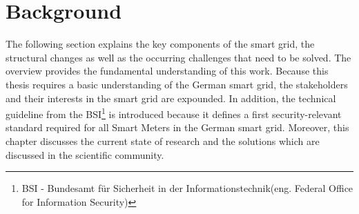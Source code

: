 \chapter{Background}
\label{sec:state}







The following section explains the key components of the smart grid, the structural changes as well as the occurring challenges that need to be solved. The overview provides the fundamental understanding of this work. Because this thesis requires a basic understanding of the German smart grid, the stakeholders and their interests in the smart grid are expounded. In addition, the technical guideline from the BSI\footnote[1]{BSI - Bundesamt für Sicherheit in der Informationstechnik(eng. Federal Office for Information Security)} is introduced because it defines a first security-relevant standard required for all Smart Meters in the German smart grid. Moreover, this chapter discusses the current state of research and the solutions which are discussed in the scientific community.\\

